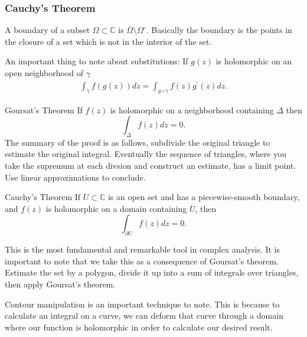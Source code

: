 \documentclass{article}
\begin{document}
        \subsubsection{Cauchy's Theorem}

        A boundary of a subset \( \Omega \subset \mathbb{C}  \) is \( \overline{\Omega }\setminus  \Omega ^\circ  \). Basically the boundary is the points in the closure of a set which is not in the interior of the set. 
        
        An important thing to note about substitutions:
        If \( g(z) \) is holomorphic on an open neighborhood of \( \gamma  \) 
        \begin{align*}
            \int _\gamma f(g(z)) dz = \int _{g \circ \gamma } f(z) g^\prime (z) dz.
        \end{align*}
        
        \begin{thrm}{Goursat's Theorem}{}
            If \( f(z) \) is holomorphic on a neighborhood containing \( \Delta   \) then 
            \[
                \int _\Delta f(z) dz = 0.
            \]
            \tcbline
            The summary of the proof is as follows, subdivide the original triangle to estimate the original integral. Eventually the sequence of triangles, where you take the supremum at each divsion and construct an estimate, has a limit point. Use linear approximations to conclude. 
            \end{thrm}

        \begin{thrm}{Cauchy's Theorem}{}
        If \( U \subset \mathbb{C}  \) is an open set and has a piecewise-smooth boundary, and \( f(z) \) is holomorphic on a domain containing \( \overline{U}  \), then
        \[
            \int _{\partial U } f(z) dz = 0.
        \]
        
        This is the most fundamental and remarkable tool in complex analysis.
        \tcbline
        It is important to note that we take this as a consequence of Goursat's theorem. Estimate the set by a polygon, divide it up into a sum of integrals over triangles, then apply Goursat's theorem. 
        \end{thrm}



        Contour manipulation is an important technique to note. This is because to calculate an integral on a curve, we can deform that curve through a domain where our function is holomorphic in order to calculate our desired result. 
\end{document}
